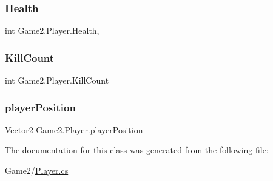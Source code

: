 \subsubsection{\texorpdfstring{Health}{Health}}
{\footnotesize\ttfamily int Game2.\+Player.\+Health\hspace{0.3cm}{\ttfamily [get]}, {\ttfamily [set]}}

\mbox{\label{class_game2_1_1_player_a0de12ae1963fa77b943c0da0c41d9a38}} 
\subsubsection{\texorpdfstring{Kill\+Count}{KillCount}}
{\footnotesize\ttfamily int Game2.\+Player.\+Kill\+Count\hspace{0.3cm}{\ttfamily [get]}}

\mbox{\label{class_game2_1_1_player_a03cfdc80acd38082853948af2f299824}} 
\subsubsection{\texorpdfstring{player\+Position}{playerPosition}}
{\footnotesize\ttfamily Vector2 Game2.\+Player.\+player\+Position\hspace{0.3cm}{\ttfamily [get]}}



The documentation for this class was generated from the following file\+:\begin{DoxyCompactItemize}
\item 
Game2/\mbox{\hyperlink{_player_8cs}{Player.\+cs}}\end{DoxyCompactItemize}
